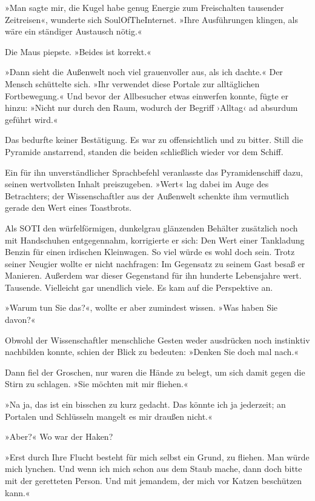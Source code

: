 »Man sagte mir, die Kugel habe genug Energie zum Freischalten tausender Zeitreisen«, wunderte sich SoulOfTheInternet. »Ihre Ausführungen klingen, als wäre ein ständiger Austausch nötig.«

Die Maus piepste. »Beides ist korrekt.«

»Dann sieht die Außenwelt noch viel grauenvoller aus, als ich dachte.« Der Mensch schüttelte sich. »Ihr verwendet diese Portale zur alltäglichen Fortbewegung.« Und bevor der Allbesucher etwas einwerfen konnte, fügte er hinzu: »Nicht nur durch den Raum, wodurch der Begriff ›Alltag‹ ad absurdum geführt wird.«

Das bedurfte keiner Bestätigung. Es war zu offensichtlich und zu bitter. Still die Pyramide anstarrend, standen die beiden schließlich wieder vor dem Schiff.

Ein für ihn unverständlicher Sprachbefehl veranlasste das Pyramidenschiff dazu, seinen wertvollsten Inhalt preiszugeben. »Wert« lag dabei im Auge des Betrachters; der Wissenschaftler aus der Außenwelt schenkte ihm vermutlich gerade den Wert eines Toastbrots.

Als SOTI den würfelförmigen, dunkelgrau glänzenden Behälter zusätzlich noch mit Handschuhen entgegennahm, korrigierte er sich: Den Wert einer Tankladung Benzin für einen irdischen Kleinwagen. So viel würde es wohl doch sein. Trotz seiner Neugier wollte er nicht nachfragen: Im Gegensatz zu seinem Gast besaß er Manieren. Außerdem war dieser Gegenstand für ihn hunderte Lebensjahre wert. Tausende. Vielleicht gar unendlich viele. Es kam auf die Perspektive an.

»Warum tun Sie das?«, wollte er aber zumindest wissen. »Was haben Sie davon?«

Obwohl der Wissenschaftler menschliche Gesten weder ausdrücken noch instinktiv nachbilden konnte, schien der Blick zu bedeuten: »Denken Sie doch mal nach.«

Dann fiel der Groschen, nur waren die Hände zu belegt, um sich damit gegen die Stirn zu schlagen. »Sie möchten mit mir fliehen.«

»Na ja, das ist ein bisschen zu kurz gedacht. Das könnte ich ja jederzeit; an Portalen und Schlüsseln mangelt es mir draußen nicht.«

»Aber?« Wo war der Haken?

»Erst durch Ihre Flucht besteht für mich selbst ein Grund, zu fliehen. Man würde mich lynchen. Und wenn ich mich schon aus dem Staub mache, dann doch bitte mit der geretteten Person. Und mit jemandem, der mich vor Katzen beschützen kann.«

